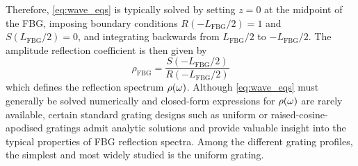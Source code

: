 Therefore, \eqref{eq:wave_eqs} is typically solved by setting $z = 0$ at the midpoint of the FBG, imposing boundary conditions $R(-L_\text{FBG}/2) = 1$ and $S(L_\text{FBG}/2) = 0$, and integrating backwards from $L_\text{FBG}/2$ to $-L_\text{FBG}/2$. The amplitude reflection coefficient is then given by
%
\begin{equation}
\label{eq:rho}
    \rho_\text{FBG} = \frac{S(-L_\text{FBG}/2)}{R(-L_\text{FBG}/2)}
\end{equation}
%
which defines the reflection spectrum $\rho(\omega)$.
Although \eqref{eq:wave_eqs} must generally be solved numerically and closed-form expressions for $\rho(\omega)$ are rarely available, certain standard grating designs such as uniform or raised-cosine-apodised gratings admit analytic solutions and provide valuable insight into the typical properties of FBG reflection spectra.
Among the different grating profiles, the simplest and most widely studied is the uniform grating.
%
%
